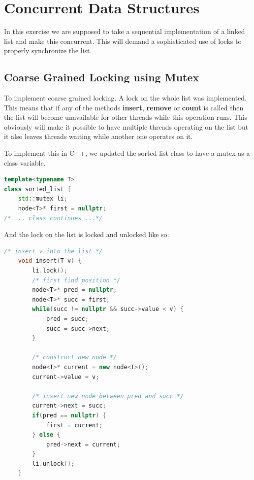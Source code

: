 \section{Concurrent Data Structures}

In this exercise we are supposed to take a sequential implementation of a 
linked list and make this concurrent. This will demand a sophisticated use of
locks to properly synchronize the list.

\subsection{Coarse Grained Locking using Mutex}

To implement coarse grained locking. A lock on the whole list was implemented.
This means that if any of the methods \textbf{insert}, \textbf{remove} or 
\textbf{count} is called then the list will become unavailable for other threads while 
this operation runs. This obviously will make it possible to have multiple 
threads operating on the list but it also leaves threads waiting while another 
one operates on it.

To implement this in C++, we updated the sorted list class to have a mutex as a
class variable.

\begin{lstlisting}[language=C++]
template<typename T>
class sorted_list {
	std::mutex li;
	node<T>* first = nullptr;
/* ... class continues ...*/
\end{lstlisting}

And the lock on the list is locked and unlocked like so:

\begin{lstlisting}[language=C++, caption=Coarse-Grained Insert]
    /* insert v into the list */
    void insert(T v) {
        li.lock();
        /* first find position */
        node<T>* pred = nullptr;
        node<T>* succ = first;
        while(succ != nullptr && succ->value < v) {
            pred = succ;
            succ = succ->next;
        }
        
        /* construct new node */
        node<T>* current = new node<T>();
        current->value = v;
    
        /* insert new node between pred and succ */
        current->next = succ;
        if(pred == nullptr) {
            first = current;
        } else {
            pred->next = current;
        }
        li.unlock();
    }
\end{lstlisting}

